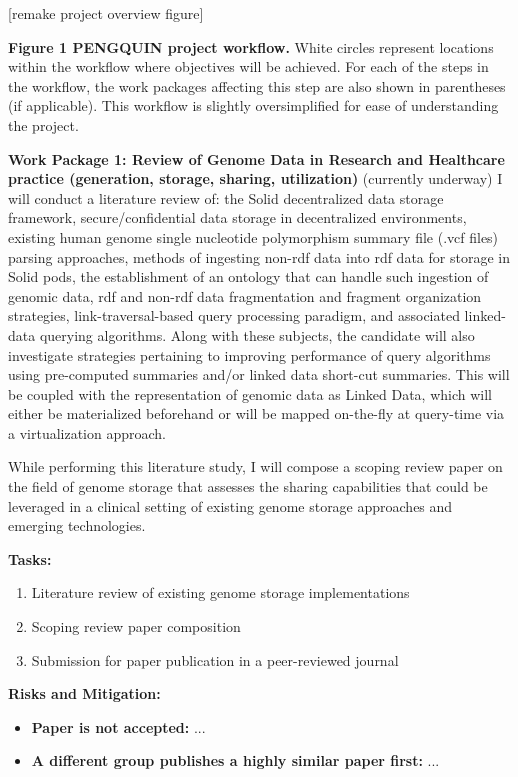 \documentclass{article}
\begin{document}
[remake project overview figure]

\textbf{Figure 1 PENGQUIN project workflow.} White circles represent locations within the workflow where objectives will be achieved. For each of the steps in the workflow, the work packages affecting this step are also shown in parentheses (if applicable). This workflow is slightly oversimplified for ease of understanding the project.

\textbf{Work Package 1: Review of Genome Data in Research and Healthcare practice (generation, storage, sharing, utilization)} (currently underway)
I will conduct a literature review of: the Solid decentralized data storage framework, secure/confidential data storage in decentralized environments, existing human genome single nucleotide polymorphism summary file (.vcf files) parsing approaches, methods of ingesting non-rdf data into rdf data for storage in Solid pods, the establishment of an ontology that can handle such ingestion of genomic data, rdf and non-rdf data fragmentation and fragment organization strategies, link-traversal-based query processing paradigm, and associated linked-data querying algorithms. Along with these subjects, the candidate will also investigate strategies pertaining to improving performance of query algorithms using pre-computed summaries and/or linked data short-cut summaries. This will be coupled with the representation of genomic data as Linked Data, which will either be materialized beforehand or will be mapped on-the-fly at query-time via a virtualization approach.

While performing this literature study, I will compose a scoping review paper on the field of genome storage that assesses the sharing capabilities that could be leveraged in a clinical setting of existing genome storage approaches and emerging technologies. 

\textbf{Tasks:} 
\begin{enumerate}
	\item Literature review of existing genome storage implementations
	\item Scoping review paper composition
	\item Submission for paper publication in a peer-reviewed journal
\end{enumerate}

\textbf{Risks and Mitigation:}  
\begin{itemize}
	\item \textbf{Paper is not accepted:} ... 
	\item \textbf{A different group publishes a highly similar paper first:} ...
\end{itemize}
\end{document}
